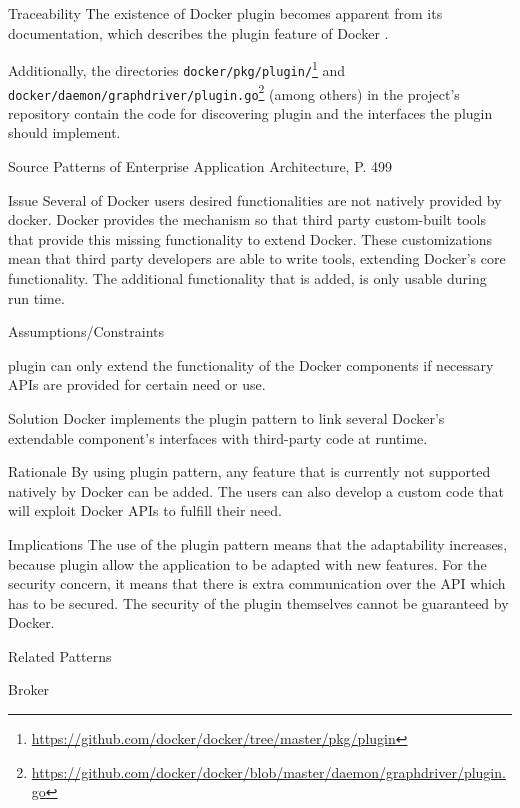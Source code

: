 \begin{patdescription}

\item [Traceability]
The existence of Docker plugin becomes apparent from its documentation, which
describes the plugin feature of Docker \cite{dockerplugindocs}.

Additionally, the directories \verb|docker/pkg/plugin/|\footnote{\url{https://github.com/docker/docker/tree/master/pkg/plugin}} and
\verb|docker/daemon/graphdriver/plugin.go|\footnote{
\url{https://github.com/docker/docker/blob/master/daemon/graphdriver/plugin.go}}
(among others) in the project's repository contain the code for discovering
plugin and the interfaces the plugin should implement.

\item [Source]
Patterns of Enterprise Application Architecture, P. 499 \cite{eaa}

\item [Issue]
Several of Docker users desired functionalities are not natively provided by
docker. Docker provides the mechanism so that third party custom-built tools
that provide this missing functionality to extend Docker. These customizations
mean that third party developers are able to write tools, extending Docker's
core functionality\cite{dockerpluginblog}. The additional functionality that is
added, is only usable during run time.


\item [Assumptions/Constraints]
\begin{mynesteditemlist}
\item plugin can only extend the functionality of the Docker components if
necessary APIs are provided for certain need or use.
\end{mynesteditemlist}

\item [Solution]
Docker implements the plugin pattern to link several Docker's extendable
component's interfaces with third-party code at runtime.

\item [Rationale]  %
By using plugin pattern, any feature that is currently not supported natively
by Docker can be added. The users can also develop a custom code that will
exploit Docker APIs to fulfill their need.

\item [Implications]
The use of the plugin pattern means that the adaptability increases, because
plugin allow the application to be adapted with new features. For the security
concern, it means that there is extra communication over the API which has to be
secured. The security of the plugin themselves cannot be guaranteed by Docker.

\item [Related Patterns]
\begin{mynesteditemlist}
\item Broker
\end{mynesteditemlist}
\end{patdescription}

